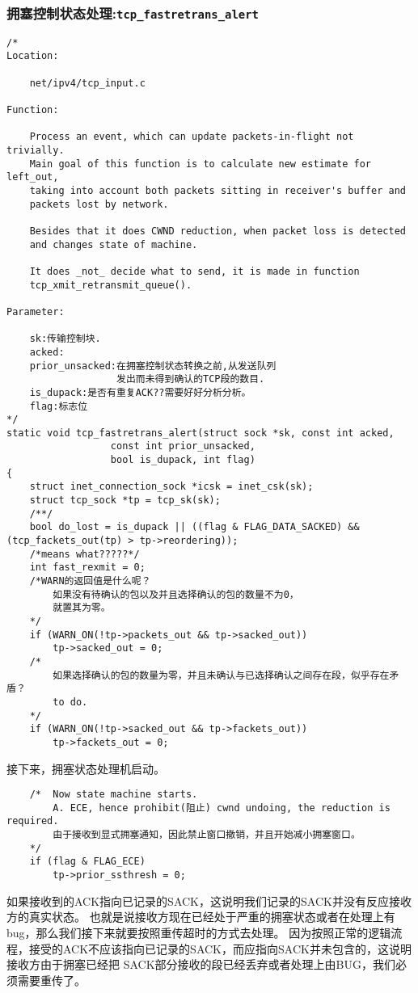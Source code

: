 		\subsubsection{拥塞控制状态处理:\texttt{tcp_fastretrans_alert}}
\begin{verbatim}
/* 
Location:

	net/ipv4/tcp_input.c

Function:

	Process an event, which can update packets-in-flight not trivially.
	Main goal of this function is to calculate new estimate for left_out,
	taking into account both packets sitting in receiver's buffer and
	packets lost by network.
	
	Besides that it does CWND reduction, when packet loss is detected
	and changes state of machine.
	
	It does _not_ decide what to send, it is made in function
	tcp_xmit_retransmit_queue().

Parameter:

	sk:传输控制块.
	acked:
	prior_unsacked:在拥塞控制状态转换之前,从发送队列
				   发出而未得到确认的TCP段的数目.
	is_dupack:是否有重复ACK??需要好好分析分析。
	flag:标志位
*/
static void tcp_fastretrans_alert(struct sock *sk, const int acked,
				  const int prior_unsacked,
				  bool is_dupack, int flag)
{
	struct inet_connection_sock *icsk = inet_csk(sk);
	struct tcp_sock *tp = tcp_sk(sk);
	/**/
	bool do_lost = is_dupack || ((flag & FLAG_DATA_SACKED) && (tcp_fackets_out(tp) > tp->reordering));
	/*means what?????*/	
	int fast_rexmit = 0;
	/*WARN的返回值是什么呢？
		如果没有待确认的包以及并且选择确认的包的数量不为0，
		就置其为零。
	*/
	if (WARN_ON(!tp->packets_out && tp->sacked_out))
		tp->sacked_out = 0;
	/*
		如果选择确认的包的数量为零，并且未确认与已选择确认之间存在段，似乎存在矛盾？
		to do.
	*/
	if (WARN_ON(!tp->sacked_out && tp->fackets_out))
		tp->fackets_out = 0;
\end{verbatim}

		接下来，拥塞状态处理机启动。
\begin{verbatim}
	/* 	Now state machine starts.
	 	A. ECE, hence prohibit(阻止) cwnd undoing, the reduction is required. 
		由于接收到显式拥塞通知，因此禁止窗口撤销，并且开始减小拥塞窗口。
	*/
	if (flag & FLAG_ECE)
		tp->prior_ssthresh = 0;
\end{verbatim}

	如果接收到的ACK指向已记录的SACK，这说明我们记录的SACK并没有反应接收方的真实状态。
	也就是说接收方现在已经处于严重的拥塞状态或者在处理上有bug，那么我们接下来就要按照重传超时的方式去处理。
	因为按照正常的逻辑流程，接受的ACK不应该指向已记录的SACK，而应指向SACK并未包含的，这说明接收方由于拥塞已经把
	SACK部分接收的段已经丢弃或者处理上由BUG，我们必须需要重传了。
	
